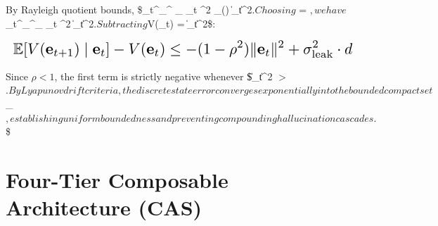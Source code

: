 \documentclass[10pt,journal,compsoc,twocolumn]{IEEEtran}
\begin{document}
By Rayleigh quotient bounds, \$\_t^\top {}\_{}^\top {} \_{} \_t \le \rho^2 \lambda\_{\max}() \|\_t\|^2$. Choosing $ = $, we have $\_t^\top {}\_{}^\top {}\_{} \_t \le \rho^2 \|\_t\|^2$. Subtracting $V(\_t) = \|\_t\|^2\$:

























\begin{equation}
\resizebox{\columnwidth}{!}{$\displaystyle
\begin{aligned}
\mathbb{E}[V(\mathbf{e}_{t+1}) \mid \mathbf{e}_t] - V(\mathbf{e}_t) \le -(1 - \rho^2) \|\mathbf{e}_t\|^2 + \sigma_{\text{leak}}^2 \cdot d
\end{aligned}
$}
\end{equation}

























Since $\rho < 1$, the first term is strictly negative whenever \$\|\_t\|^2 $>$ $. By Lyapunov drift criteria, the discrete state error converges exponentially into the bounded compact set $\_\eta$, establishing uniform boundedness and preventing compounding hallucination cascades. $\square\$




\section{Four-Tier Composable Architecture (CAS)}
\end{document}
